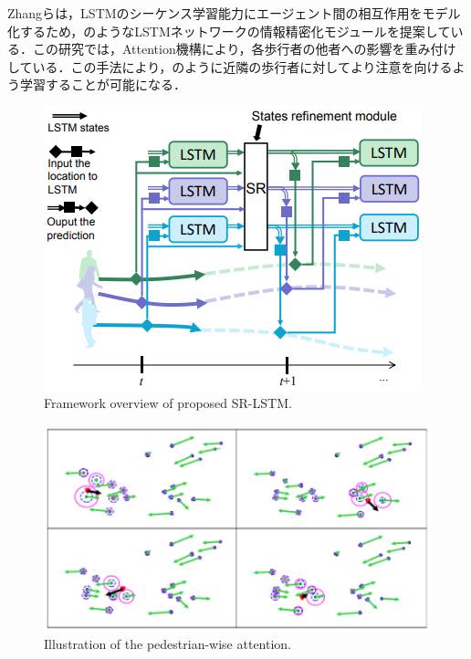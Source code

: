 
Zhangら\cite{sr-lstm}は，LSTMのシーケンス学習能力にエージェント間の相互作用をモデル化するため，のようなLSTMネットワークの情報精密化モジュールを提案している．この研究では，Attention機構により，各歩行者の他者への影響を重み付けしている．この手法により，のように近隣の歩行者に対してより注意を向けるよう学習することが可能になる．


\begin{figure}[hbtp]
     \centering
    \includegraphics[keepaspectratio, scale=0.6]
         {images/sr-lstm-str.png}
    \caption{Framework overview of proposed SR-LSTM.\protect\footnotemark[2]}
    \label{Fig:sr-lstm-str}
\end{figure}


\begin{figure}[hbtp]
     \centering
    \includegraphics[keepaspectratio, scale=0.6]
         {images/sr-lstm.png}
    \caption{Illustration of the pedestrian-wise attention.\protect\footnotemark[2]}
    \label{Fig:sr-lstm}
\end{figure}

